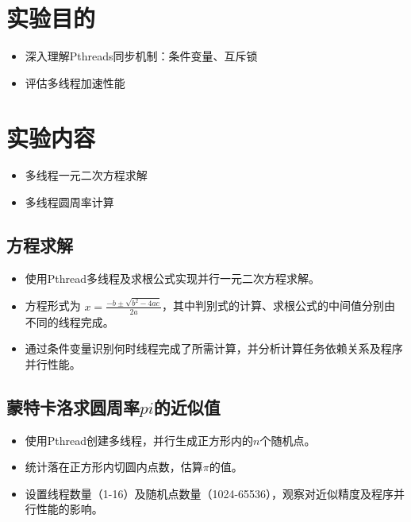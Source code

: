 \documentclass{SYSUReport}
\date{2025年4月16日}
\begin{document}
\cover
\thispagestyle{empty} %
\clearpage



\section{实验目的}
\begin{itemize}
    \item 深入理解Pthreads同步机制：条件变量、互斥锁
    \item 评估多线程加速性能
\end{itemize}

\section{实验内容}
\begin{itemize}
    \item 多线程一元二次方程求解
    \item 多线程圆周率计算
\end{itemize}
\subsection{方程求解}
\begin{itemize}
   \item 使用Pthread多线程及求根公式实现并行一元二次方程求解。
    \item 方程形式为 $x = \frac{-b\pm\sqrt{b^2-4ac}}{2a}$，其中判别式的计算、求根公式的中间值分别由不同的线程完成。
    \item 通过条件变量识别何时线程完成了所需计算，并分析计算任务依赖关系及程序并行性能。
    \end{itemize}
\subsection{蒙特卡洛求圆周率$pi$的近似值}
\begin{itemize}
   \item 使用Pthread创建多线程，并行生成正方形内的$n$个随机点。
    \item 统计落在正方形内切圆内点数，估算$\pi$的值。
    \item 设置线程数量（1-16）及随机点数量（1024-65536），观察对近似精度及程序并行性能的影响。
\end{itemize}
\end{document}
